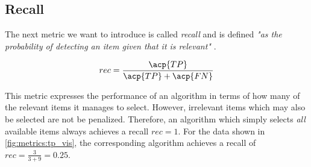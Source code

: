 \subsection{Recall}
\label{chp:fundamentals:sec:metrics:subsec:Recall}

The next metric we want to introduce is called \textit{recall} and is defined \textit{"as the probability of detecting an item given that it is relevant"} \parencite{Zhu:2004}.

\begin{equation}\label{eq:recall}
    rec = \frac{\acp{TP}}{\acp{TP}+\acp{FN}}
\end{equation}

This metric expresses the performance of an algorithm in terms of how many of the relevant items it manages to select.
However, irrelevant items which may also be selected are not be penalized.
Therefore, an algorithm which simply selects \textit{all} available items always achieves a recall $rec=1$.
For the data shown in \cref{fig:metrics:tp_vis}, the corresponding algorithm achieves a recall of $rec = \frac{3}{3+9} = 0.25$.
